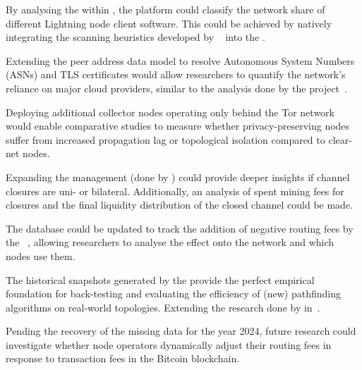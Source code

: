 \begin{description}[leftmargin=1em, style=nextline]
    \item[Node Implementation Heuristics:] 
        By analysing the  within , 
        the platform could classify the network share of different Lightning node client software. 
        This could be achieved by natively integrating the scanning heuristics developed by 
        \citeauthor{myers_impscan_2025}~\cite{myers_impscan_2025} into the .
    
    \item[ISP and Cloud Centralization:] 
        Extending the peer address data model to resolve Autonomous System Numbers (ASNs) 
        and TLS certificates would allow researchers to quantify the network's reliance on major cloud providers, 
        similar to the analysis done by the  project~\cite{mempooldevelopers_mempool_2026}.
    
    \item[Tor Network Dynamics:] 
        Deploying additional collector nodes operating only behind the Tor network 
        would enable comparative studies to measure whether privacy-preserving nodes 
        suffer from increased propagation lag or topological isolation compared to clear-net nodes.
    
    \item[Advanced Closure Analysis:] 
        Expanding the  management (done by ) 
        could provide deeper insights if channel closures are uni- or bilateral.
        Additionally, an analysis of spent mining fees for closures and 
        the final liquidity distribution of the closed channel could be made.
    
    \item[Negative Routing Fees:] 
        The database could be updated to track the addition of negative routing fees by the \citeauthor{lnddeveloper_lightningnetwork_2026}~\cite{lnddeveloper_lnd_2024}, 
        allowing researchers to analyse the effect onto the network and which nodes use them.
    
    \item[Routing Algorithm Simulations:] 
        The historical snapshots generated by the  provide the perfect empirical foundation 
        for back-testing and evaluating the efficiency of (new) pathfinding algorithms on real-world topologies.
        Extending the research done by \citeauthor{saraswathi_exposition_2024} in~\cite{saraswathi_exposition_2024}.
    
    \item[Fee Market Correlations:] 
        Pending the recovery of the missing  data for the year 2024, 
        future research could investigate whether node operators dynamically adjust their routing fees
        in response to transaction fees in the Bitcoin blockchain.
\end{description}


